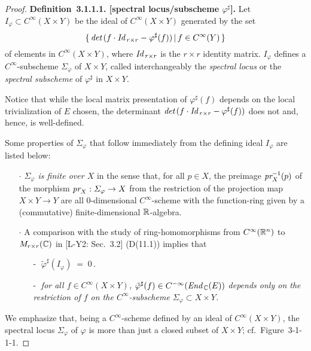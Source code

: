 \documentclass[11pt]{article}
\numberwithin{equation}{subsection}
\newcommand{\End}{\mbox{\it End}\,}
\newcommand{\Id}{\mbox{\it Id}\,}
\newcommand{\determinant}{\mbox{\it det}\,}
\newcommand{\pr}{\mbox{\it pr}}
\begin{document}
\begin{proof}
 \noindent
 {\bf Definition~3.1.1.1. [spectral locus/subscheme $\varphi^{\sharp}$].}
   Let $I_{\varphi}\subset C^{\infty}(X\times Y)$ be the ideal of $C^{\infty}(X\times Y)$
     generated by the set
     $$
        \{\,\determinant (f\cdot\Id_{r\times r}-\varphi^{\sharp}(f)) \,|\, f\in C^{\infty}(Y)\,\}
     $$
     of elements in $C^{\infty}(X\times Y)$, where $\Id_{r\times r}$ is the $r\times r$ identity matrix.
   $I_{\varphi}$  defines a $C^{\infty}$-subscheme  $\varSigma_{\varphi}$ of $X\times Y$,
    called interchangeably the {\it spectral locus} or the {\it spectral subscheme} of $\varphi^{\sharp}$
    in $X\times Y$.

 \bigskip

 \noindent
 Notice that
  while the local matrix presentation of $\varphi^{\sharp}(f)$
    depends on the local trivialization of $E$ chosen,
  the determinant $\determinant(f\cdot\Id_{r\times r}-\varphi^{\sharp}(f))$ does not
     and, hence, is well-defined.

 Some properties of $\varSigma_{\varphi}$ that follow immediately from the defining ideal $I_{\varphi}$
  are listed below:
  \begin{itemize}
   \item[\LARGE $\cdot$]
    {\it $\varSigma_{\varphi}$ is finite over $X$}
 	 in the sense that, for all $p\in X$,
	 the preimage $\pr_X^{-1}(p)$  of the morphism $\pr_X:\varSigma_{\varphi}\rightarrow X$
	   from the restriction of the projection map $X\times Y\rightarrow Y$
	  are all $0$-dimensional $C^{\infty}$-scheme
	  with the function-ring given by a (commutative) finite-dimensional ${\Bbb R}$-algebra. 	
	
   \item[\LARGE $\cdot$]
    A comparison with the study of ring-homomorphisms from $C^{\infty}({\Bbb R}^n)$ to
	 $M_{r\times r}({\Bbb C})$ in [L-Y2: Sec.\ 3.2] (D(11.1))
	 implies that
	 \begin{itemize}
	  \item[-$\;$]
       $\tilde{\varphi}^{\sharp}(I_{\varphi})\;=\; 0\,$.
	
	  \item[-$\;$]\it
	   for all $f\in C^{\infty}(X\times Y)$,
       $\tilde{\varphi}^{\sharp}(f)\in C^{-{\infty}}(\End_{\Bbb C}(E))$
	   depends only on the restriction of $f$ on the $C^{\infty}$-subscheme
	    $\varSigma_{\varphi}\subset X\times Y$.	
	 \end{itemize}
  \end{itemize} 	
 We emphasize that,
  being a $C^{\infty}$-scheme defined by an ideal of $C^{\infty}(X\times Y)$,
  the spectral locus $\varSigma_{\varphi}$ of $\varphi$
    is more than just a closed subset of $X\times Y$;
  cf.\ {\sc Figure}~3-1-1-1.



\end{proof}
\end{document}
